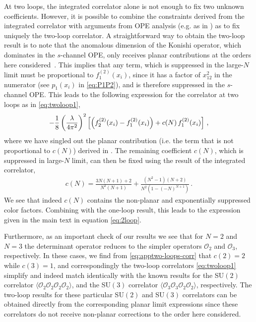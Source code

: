 \documentclass[aps,prl,twocolumn, longbibliography,footinbib,superscriptaddress, preprintnumbers]{revtex4-1}
\newcommand{\<}{\langle}
\renewcommand{\>}{\rangle}
\begin{document}
{At two loops, the  integrated correlator alone is not enough to fix two unknown coefficients. However, it is possible to combine the constraints derived from the integrated correlator with arguments from OPE analysis (e.g. as in \cite{Jiang:2023uut}) as to fix uniquely the two-loop correlator. A straightforward way to obtain the two-loop result is to note that  the anomalous dimension of the Konishi operator, which dominates in the $s$-channel OPE, only receives planar contributions at the orders here considered~\cite{Fiamberti:2007rj}. This implies that any term, which is suppressed in the large-$N$ limit must be proportional to $f_1^{(2)}(x_i)$,  since it has a factor of $x_{12}^2$  in the numerator (see $p_1(x_i)$ in \eqref{eq:P1P2}), and is therefore
suppressed in the $s$-channel OPE. This leads to the following expression for the correlator at two loops as in \eqref{eq:twoloop1},
\begin{align} \label{eq:apptwoloop1}
  -  \frac{1}{8} \left( {\lambda \over 4\pi^2} \right)^2    \left[ \left( f^{(2)}_{2}(x_i) -f^{(2)}_{1}(x_i) \right) +   c(N) \, f^{(2)}_{1}(x_i)\right] \, ,
\end{align}
where we have singled out the planar contribution (i.e. the term that is not proportional to $c(N)$) derived in \cite{Jiang:2019xdz, Jiang:2023uut}. The remaining coefficient $c(N)$, which is suppressed in large-$N$ limit, can then be fixed using the result of the integrated correlator,
\begin{align} \label{eq:apptwo-loops-corr}
    c(N) = \frac{3 N (N{+}1) {+} 2}{ N^2 (N+1)}+  \frac{ (N^2{-}1) (N{+}2)}{N^2(1 {-} (-N)^{N+1})} \, .
\end{align}
We see that indeed $c(N)$ contains the non-planar and exponentially suppressed color factors. Combining with the one-loop result, this leads to the expression given in the main text in equation \eqref{eq:2loop}.


Furthermore, as an important check of our results we see that for $N=2$ and $N=3$  the determinant  operator reduces to the simpler operators $\mathcal{O}_2$ and $\mathcal{O}_3$, respectively. In these cases, we find from \eqref{eq:apptwo-loops-corr} that  $c(2)=2$ while $   c(3)=1$,
and correspondingly the two-loop correlators \eqref{eq:twoloop1} simplify and indeed match identically with the known results for the SU$(2)$ correlator $  \langle \mathcal{O}_2
\mathcal{O}_2  \mathcal{O}_2   \mathcal{O}_2  \rangle$, and the SU$(3)$ correlator   $\langle \mathcal{O}_3
\mathcal{O}_3  \mathcal{O}_2  \mathcal{O}_2   \rangle$, respectively. The two-loop results for these particular SU$(2)$ and SU$(3)$ correlators can be obtained directly from the corresponding planar limit expressions \cite{Eden:2012tu, Chicherin:2015edu} since these correlators do not receive non-planar corrections to the order here considered.

}
\end{document}
